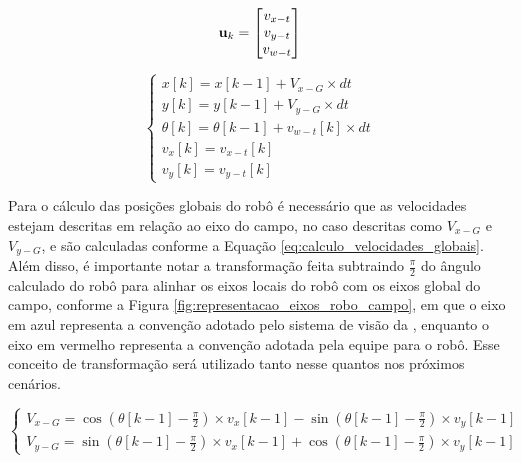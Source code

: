 \documentclass[acronym, symbols, table]{fei}
\begin{document}
				\begin{equation}\label{eq:entrada_predicao_modelo}
					\text{\textbf{u}}_k =
					\begin{bmatrix}
						v_{x-t} \\
						v_{y-t} \\
						v_{w-t}
					\end{bmatrix}
				\end{equation}
				
				\begin{equation}\label{eq:predicao_cenario_1}
					\begin{cases}
						x[k] = x[k-1] + V_{x-G} \times dt \\
						y[k] = y[k-1] + V_{y-G} \times dt  \\
						\theta[k] = \theta[k-1] + v_{w-t}[k] \times dt \\
						v_x[k] = v_{x-t}[k]\\
						v_y[k] = v_{y-t}[k]
					\end{cases}
				\end{equation}
			
			Para o cálculo das posições globais do robô é necessário que as velocidades estejam descritas em relação ao eixo do campo, no caso descritas como $V_{x-G}$ e $V_{y-G}$, e são calculadas conforme a Equação \ref{eq:calculo_velocidades_globais}. Além disso, é importante notar a transformação feita subtraindo $\frac{\pi}{2}$ do ângulo calculado do robô para alinhar os eixos locais do robô com os eixos global do campo, conforme a Figura \ref{fig:representacao_eixos_robo_campo}, em que o eixo em azul representa a convenção adotado pelo sistema de visão da , enquanto o eixo em vermelho representa a convenção adotada pela equipe para o robô. Esse conceito de transformação será utilizado tanto nesse quantos nos próximos cenários.
			
				\begin{equation}\label{eq:calculo_velocidades_globais}
					\begin{cases}
						V_{x-G} = \cos(\theta[k-1] - \frac{\pi}{2}) \times v_x[k-1] - \sin(\theta[k-1] - \frac{\pi}{2}) \times v_y[k-1] \\
						V_{y-G} = \sin(\theta[k-1] - \frac{\pi}{2}) \times v_x[k-1] + \cos(\theta[k-1] - \frac{\pi}{2}) \times v_y[k-1]
					\end{cases}
				\end{equation}
			
\end{document}
